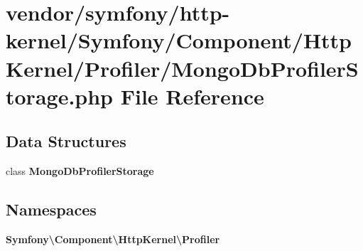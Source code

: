 \section{vendor/symfony/http-\/kernel/\+Symfony/\+Component/\+Http\+Kernel/\+Profiler/\+Mongo\+Db\+Profiler\+Storage.php File Reference}
\label{_mongo_db_profiler_storage_8php}
\subsection*{Data Structures}
\begin{DoxyCompactItemize}
\item 
class {\bf Mongo\+Db\+Profiler\+Storage}
\end{DoxyCompactItemize}
\subsection*{Namespaces}
\begin{DoxyCompactItemize}
\item 
 {\bf Symfony\textbackslash{}\+Component\textbackslash{}\+Http\+Kernel\textbackslash{}\+Profiler}
\end{DoxyCompactItemize}
